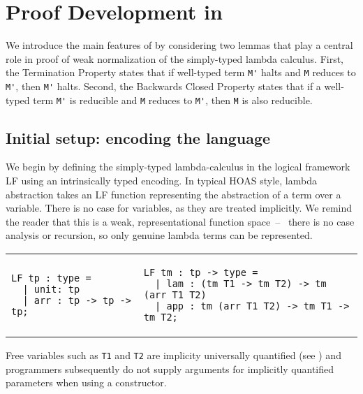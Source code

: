 \chapter{Proof Development in \Harpoon}
\label{chap:example}

We introduce the main features of \Harpoon{} by considering two
lemmas that play a central role in proof of weak normalization of
the simply-typed lambda calculus.
First, the Termination Property states that if
well-typed term \lstinline!M'! halts and \lstinline!M!
reduces to \lstinline!M'!, then \lstinline!M'! halts.
Second, the Backwards Closed Property states that if a well-typed term
\lstinline!M'! is reducible and \lstinline!M! reduces to \lstinline!M'!, then
\lstinline!M! is also reducible.

\section{Initial setup: encoding the language}
\label{sec:setup-1}
We begin by defining the simply-typed lambda-calculus in the logical
framework LF \cite{Harper93jacm} using an intrinsically typed
encoding.
In typical HOAS style, lambda abstraction takes an LF function representing the
abstraction of a term over a variable. There is no case for variables, as they
are treated implicitly.
We remind the reader that this is a weak, representational function space~--~%
there is no case analysis or recursion, so only genuine lambda terms can
be represented.
%
\begin{center}
\begin{tabular}{ll}
\begin{lstlisting}
LF tp : type =
  | unit: tp
  | arr : tp -> tp -> tp;
\end{lstlisting}
  &
\begin{lstlisting}
LF tm : tp -> type =
  | lam : (tm T1 -> tm T2) -> tm (arr T1 T2)
  | app : tm (arr T1 T2) -> tm T1 -> tm T2;
\end{lstlisting}
\end{tabular}
\end{center}
%
Free variables such as \lstinline!T1! and \lstinline!T2! are
implicity universally quantified (see \cite{Pientka:JFP13})
and programmers subsequently do not supply arguments for
implicitly quantified parameters when using a constructor.




